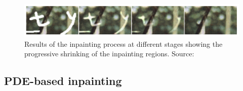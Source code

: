 \begin{figure}[h]
    \centering
    \includegraphics[width=\linewidth]{../Images/inpainting_progress.png}
    \caption{Results of the inpainting process at different stages showing the progressive
    shrinking of the inpainting regions. Source: \cite{bertalmio00}}
    \label{fig:InpaintingProgress}
\end{figure}


\subsection{PDE-based inpainting}

